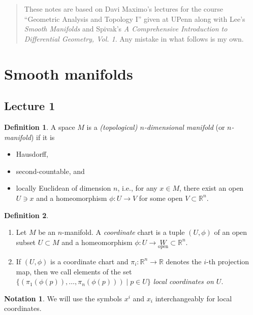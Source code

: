 \documentclass[10pt,letterpaper,cm]{nupset}
\theoremstyle{definition}
\newtheorem*{definition}{Definition}
\newtheorem*{notation}{Notation}
\newcommand{\R}{\mathbb R}
\newcommand{\1}{\mathbf{1}}
\newcommand{\0}{\vec 0}
\begin{document}
\begin{abstract}
These notes are based on Davi Maximo's lectures for the course ``Geometric Analysis and Topology I'' given at UPenn along with Lee's \textit{Smooth Manifolds} and Spivak's \textit{A Comprehensive Introduction to Differential Geometry, Vol. 1}. Any mistake in what follows is my own.
\end{abstract}


\tableofcontents
\newpage

\section{Smooth manifolds}

\subsection{Lecture 1}

\theoremstyle{definition}
\begin{definition}{A space $M$ is a \textit{(topological) $n$-dimensional manifold} (or \textit{$n$-manifold}) if it is 
\begin{itemize}
\item Hausdorff, 
\item second-countable, and 
\item locally Euclidean of dimension $n$, i.e., for any $x\in M$, there exist an open $U\ni x$ and a homeomorphism $\phi : U \to V$ for some open $V\subset \R^n$.
\end{itemize}
}
\end{definition}

\begin{definition} $ $
\begin{enumerate}
\item Let $M$ be an $n$-manifold. A \textit{coordinate} chart is a tuple $(U, \phi)$ of an open subset $U\subset M$ and a homeomorphism $\phi: U \to \underset{\text{open}} W \subset \R^n$.
\item If $(U, \phi)$ is a coordinate chart and $\pi_i : \R^n \to \R$ denotes the $i$-th projection map, then we call elements of the set $\{(\pi_1(\phi(p)), \ldots, \pi_n(\phi(p))) \mid p \in U\}$ \textit{local coordinates on $U$}.
\end{enumerate}
\end{definition}

\begin{notation}
We will use the symbols $x^i$ and $x_i$ interchangeably for local coordinates. 
\end{notation}
\end{document}
